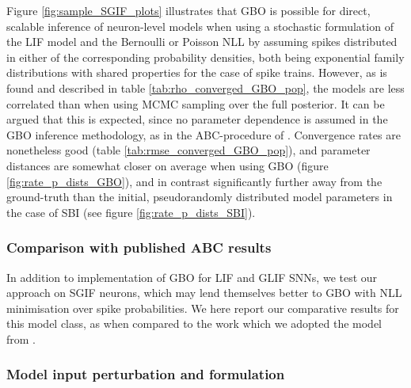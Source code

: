 \documentclass[mphil,deptreport,ianc]{infthesis} %
\begin{document}

Figure \ref{fig:sample_SGIF_plots} illustrates that GBO is possible for direct, scalable inference of neuron-level models when using a stochastic formulation of the LIF model and the Bernoulli or Poisson NLL by assuming spikes distributed in either of the corresponding probability densities, both being exponential family distributions with shared properties for the case of spike trains.
However, as is found and described in table \ref{tab:rho_converged_GBO_pop}, the models are less correlated than when using MCMC sampling over the full posterior.
It can be argued that this is expected, since no parameter dependence is assumed in the GBO inference methodology, as in the ABC-procedure of \cite{Rene2020}.
Convergence rates are nonetheless good (table \ref{tab:rmse_converged_GBO_pop}), and parameter distances are somewhat closer on average when using GBO (figure \ref{fig:rate_p_dists_GBO}), and in contrast significantly further away from the ground-truth than the initial, pseudorandomly distributed model parameters in the case of SBI (see figure \ref{fig:rate_p_dists_SBI}).



\subsubsection{Comparison with published ABC results}

In addition to implementation of GBO for LIF and GLIF SNNs, we test our approach on SGIF neurons, which may lend themselves better to GBO with NLL minimisation over spike probabilities. We here report our comparative results for this model class, as when compared to the work which we adopted the model from \cite{Rene2020}.

\subsubsection{Model input perturbation and formulation}
\end{document}
